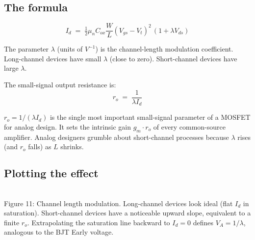 \documentclass[11pt]{article}
\begin{document}
\subsection{The formula}

\begin{equation}
\boxed{I_d \;=\; \tfrac{1}{2}\mu_n C_{ox}\frac{W}{L}(V_{gs}-V_t)^2\,(1 + \lambda V_{ds})}
\end{equation}

The parameter $\lambda$ (units of $V^{-1}$) is the channel-length modulation coefficient. Long-channel devices have small $\lambda$ (close to zero). Short-channel devices have large $\lambda$.

The small-signal output resistance is:
\begin{equation}
\boxed{r_o \;=\; \frac{1}{\lambda I_d}}
\end{equation}

\begin{keyidea}
$r_o = 1/(\lambda I_d)$ is the single most important small-signal parameter of a MOSFET for analog design. It sets the intrinsic gain $g_m \cdot r_o$ of every common-source amplifier. Analog designers grumble about short-channel processes because $\lambda$ rises (and $r_o$ falls) as $L$ shrinks.
\end{keyidea}

\subsection{Plotting the effect}

\begin{center}
\\
{\small Figure 11: Channel length modulation. Long-channel devices look ideal (flat $I_d$ in saturation). Short-channel devices have a noticeable upward slope, equivalent to a finite $r_o$. Extrapolating the saturation line backward to $I_d = 0$ defines $V_A = 1/\lambda$, analogous to the BJT Early voltage.}
\end{center}
\end{document}
